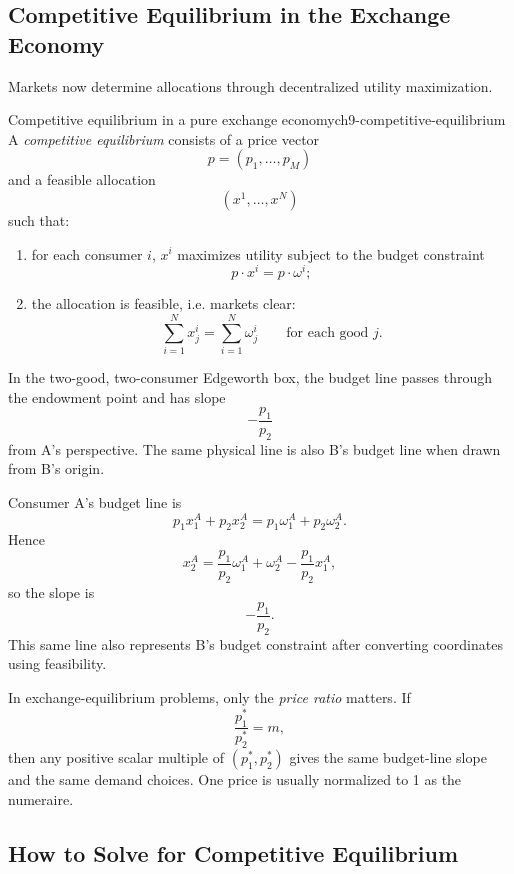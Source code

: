 \subsection{Competitive Equilibrium in the Exchange Economy}

Markets now determine allocations through decentralized utility maximization.

\begin{definition}{Competitive equilibrium in a pure exchange economy}{ch9-competitive-equilibrium}
A \emph{competitive equilibrium} consists of a price vector
\[
p=(p_1,\dots,p_M)
\]
and a feasible allocation
\[
(x^1,\dots,x^N)
\]
such that:
\begin{enumerate}
    \item for each consumer $i$, $x^i$ maximizes utility subject to the budget constraint
    \[
    p\cdot x^i = p\cdot \omega^i;
    \]
    \item the allocation is feasible, i.e. markets clear:
    \[
    \sum_{i=1}^N x_j^i = \sum_{i=1}^N \omega_j^i
    \qquad \text{for each good } j.
    \]
\end{enumerate}
\end{definition}

In the two-good, two-consumer Edgeworth box, the budget line passes through the endowment point and has slope
\[
-\frac{p_1}{p_2}
\]
from A's perspective. The same physical line is also B's budget line when drawn from B's origin.

\begin{keyformula}[title={Key Formula: Budget Line in the Edgeworth Box}]
Consumer A's budget line is
\[
p_1 x_1^A + p_2 x_2^A = p_1 \omega_1^A + p_2 \omega_2^A.
\]
Hence
\[
x_2^A
=
\frac{p_1}{p_2}\omega_1^A + \omega_2^A - \frac{p_1}{p_2}x_1^A,
\]
so the slope is
\[
-\frac{p_1}{p_2}.
\]
This same line also represents B's budget constraint after converting coordinates using feasibility.
\end{keyformula}

\begin{examtip}
In exchange-equilibrium problems, only the \emph{price ratio} matters. If
\[
\frac{p_1^*}{p_2^*}=m,
\]
then any positive scalar multiple of $(p_1^*,p_2^*)$ gives the same budget-line slope and the same demand choices. One price is usually normalized to 1 as the numeraire.
\end{examtip}

\subsection{How to Solve for Competitive Equilibrium}

